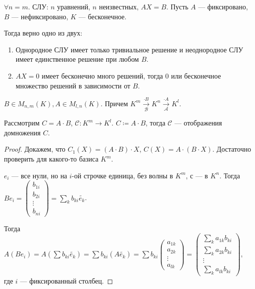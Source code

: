 \begin{theorem}
    $\forall n = m$. СЛУ: $n$ уравнений, $n$ неизвестных,  $AX=B$. Пусть  $A$ --- фиксировано,  $B$ --- нефиксировано, $K$ --- бесконечное.

    Тогда верно одно из двух:
     \begin{enumerate}
         \item Однородное СЛУ имеет только тривиальное решение и неоднородное СЛУ имеет единственное решение при любом $B$.
         \item $AX=0$ имеет бесконечно много решений, тогда 0 или бесконечное множество решений в зависимости от $B$.
    \end{enumerate}
\end{theorem}
\begin{theorem}
    $B \in M_{n, m}(K), A \in M_{l, n}(K)$. Причем  $K^m \xrightarrow[\mathcal{B}]{\cdot B} K^n \xrightarrow[\mathcal{A}]{\cdot A} K^l$.

    Рассмотрим  $C = A \cdot B$,  $\mathcal{C}\!: K^m \to K^l$.  $C \coloneqq A \cdot B$, тогда  $\mathcal{C}$ --- отображения домножения  $C$.
\end{theorem}
\begin{proof}
    Докажем, что $C_1(X) = (A \cdot B) \cdot X$,  $C(X) = A \cdot (B \cdot X)$. Достаточно проверить для какого-то базиса  $K^m$.

    $e_i$ --- все нули, но на  $i$-ой строчке единица,  без волны в $K^m$, с --- в  $K^n$.  Тогда  $Be_i = \begin{pmatrix} b_{1i} \\ b_{2i} \\ \vdots \\ b_{ni} \end{pmatrix} = \sum_k b_{ki} \widetilde{e_k}$.

    Тогда $A(Be_i) = A(\sum b_{ki} \widetilde{e_k}) = \sum b_{ki}(A\widetilde{e_k}) = \sum b_{ki} \begin{pmatrix} a_{1k} \\ a_{2k} \\ \vdots \\ a_{lk} \end{pmatrix} = \begin{pmatrix} \sum_k a_{1k} b_{ki} \\ \sum_k a_{2k} b_{ki} \\ \vdots \\ \sum_k a_{lk} b_{ki} \end{pmatrix}$, где $i$ --- фиксированный столбец.
\end{proof}

